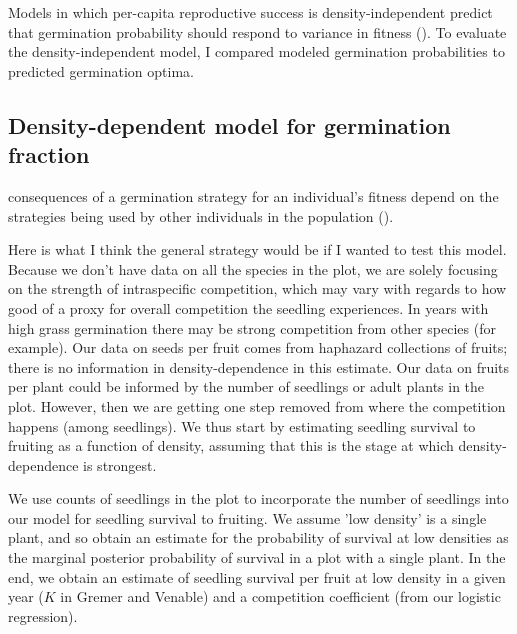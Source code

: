 \documentclass[12pt, oneside, titlepage]{article}   	%
\begin{document}
Models in which per-capita reproductive success is density-independent predict that germination probability should respond to variance in fitness (\cite{cohen1966}). To evaluate the density-independent model, I compared modeled germination probabilities to predicted germination optima. %

\iffalse
\subsection{Density-dependent model for germination fraction}
consequences of a germination strategy for an individual's fitness depend on the strategies being used by other individuals in the population (\cite{gremer2014}).

Here is what I think the general strategy would be if I wanted to test this model. Because we don't have data on all the species in the plot, we are solely focusing on the strength of intraspecific competition, which may vary with regards to how good of a proxy for overall competition the seedling experiences. In years with high grass germination there may be strong competition from other species (for example). Our data on seeds per fruit comes from haphazard collections of fruits; there is no information in density-dependence in this estimate. Our data on fruits per plant could be informed by the number of seedlings or adult plants in the plot. However, then we are getting one step removed from where the competition happens (among seedlings). We thus start by estimating seedling survival to fruiting as a function of density, assuming that this is the stage at which density-dependence is strongest. 

We use counts of seedlings in the plot to incorporate the number of seedlings into our model for seedling survival to fruiting. We assume 'low density' is a single plant, and so obtain an estimate for the probability of survival at low densities as the marginal posterior probability of survival in a plot with a single plant. In the end, we obtain an estimate of seedling survival per fruit at low density in a given year ($K$ in Gremer and Venable) and a competition coefficient (from our logistic regression).
\end{document}
